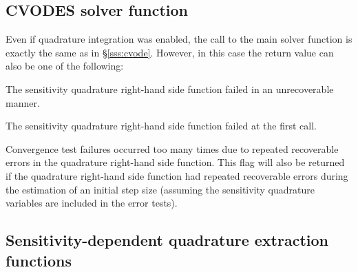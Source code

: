
\subsection{CVODES solver function}

Even if quadrature integration was enabled, the call to the main solver 
function  is exactly the same as in \S\ref{sss:cvode}. However, in this
case the return value  can also be one of the following:
\begin{args}
\item[\Id{CV\_QSRHSFUNC\_ERR}]
  The sensitivity quadrature right-hand side function failed in an unrecoverable manner.
\item[\Id{CV\_FIRST\_QSRHSFUNC\_ERR}]
  The sensitivity quadrature right-hand side function failed at the first call.
\item[\Id{CV\_REPTD\_QSRHSFUNC\_ERR}]
  Convergence test failures occurred too many times due to repeated recoverable errors in
  the quadrature right-hand side function. This flag will also
  be returned if the quadrature right-hand side function had repeated recoverable errors
  during the estimation of an initial step size (assuming the sensitivity quadrature
  variables are included in the error tests).
  \end{args}


\subsection{Sensitivity-dependent quadrature extraction functions}\label{ss:quad_sens_get}

